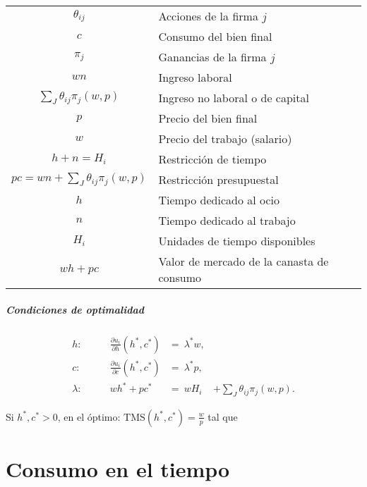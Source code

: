 \documentclass[8pt,a4paper]{extarticle}
\begin{document}
\begin{multicols}{3}
\begin{center}
\begin{tabular}{ c l }
	\hline
	$\theta_{ij}$								& Acciones de la firma $j$ \\
	$c$											& Consumo del bien final \\
	$\pi_j$										& Ganancias de la firma $j$ \\
	$wn$										& Ingreso laboral \\
	$\displaystyle \sum_J \theta_{ij} \pi_j (w,p)$			& Ingreso no laboral o de capital \\
	$p$											& Precio del bien final \\
	$w$											& Precio del trabajo (salario) \\
	$h + n = H_i$								& Restricción de tiempo \\
	$\displaystyle pc = wn + \sum_J \theta_{ij} \pi_j (w, p)$ & Restricción presupuestal \\
	$h$											& Tiempo dedicado al ocio \\
	$n$											& Tiempo dedicado al trabajo \\
	$H_i$										& Unidades de tiempo disponibles \\
	$wh + pc$									& Valor de mercado de la canasta de consumo \\
	\hline
\end{tabular}
\end{center}

\sectionbreak

\subsubsection*{Condiciones de optimalidad}

\begin{equation*}
\begin{aligned}
	h : \qquad & \frac{\partial u_i}{\partial h} (h^*, c^*) &=\ \lambda^* w,\\
	c : \qquad & \frac{\partial u_i}{\partial c} (h^*, c^*) &=\ \lambda^* p,\\
	\lambda : \qquad & wh^* + pc^* &=\ wH_i & + \sum_J \theta_{ij} \pi_j (w, p).
\end{aligned}
\end{equation*}

Si $h^*, c^* > 0$, en el óptimo: $\text{TMS} (h^*, c^*) = \displaystyle  \frac{w}{p}$ tal que 

\newpage

\part{Consumo en el tiempo}


\end{multicols}
\end{document}
